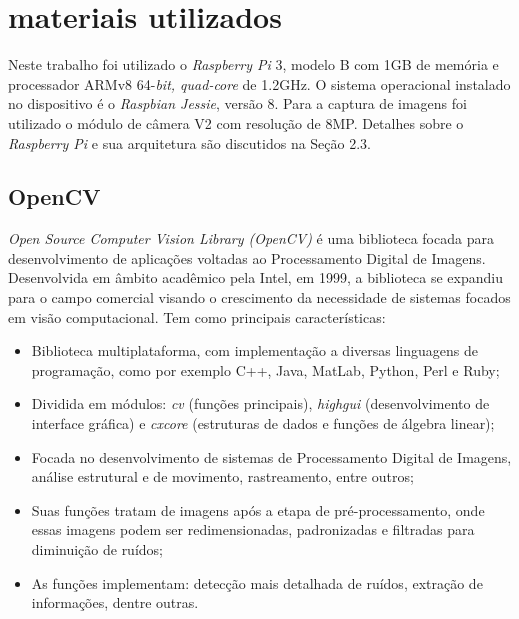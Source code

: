\documentclass[12pt,oneside,a4paper,chapter=TITLE,section=TITLE,sumario=tradicional]{abntex2}
\begin{document}
\section{materiais utilizados}

Neste trabalho foi utilizado o \textit{Raspberry Pi} 3, modelo B com 1GB de memória e processador ARMv8 64-\textit{bit, quad-core} de 1.2GHz. O sistema operacional instalado no dispositivo é o \textit{Raspbian Jessie}, versão 8. Para a captura de imagens foi utilizado o módulo de câmera V2 com resolução de 8MP. Detalhes sobre o \textit{Raspberry Pi} e sua arquitetura são discutidos na Seção 2.3.

\subsection{OpenCV}
\textit{Open Source Computer Vision Library (OpenCV)} é uma biblioteca focada para desenvolvimento de aplicações voltadas ao Processamento Digital de Imagens. Desenvolvida em âmbito acadêmico pela Intel, em 1999, a biblioteca se expandiu para o campo comercial visando o crescimento da necessidade de sistemas focados em visão computacional. Tem como principais características:
\begin{lista}
	\begin{itemize}
	    \item Biblioteca multiplataforma, com implementação a diversas linguagens de programação, como por exemplo C++, Java, MatLab, Python, Perl e Ruby;
	\end{itemize}
	\begin{itemize}
	    \item Dividida em módulos: \textit{cv} (funções principais), \textit{highgui} (desenvolvimento de interface gráfica) e \textit{cxcore} (estruturas de dados e funções de álgebra linear);
	\end{itemize}
	\begin{itemize}
	    \item Focada no desenvolvimento de sistemas de Processamento Digital de Imagens, análise estrutural e de movimento, rastreamento, entre outros;
	\end{itemize}
	\begin{itemize}
	    \item Suas funções tratam de imagens após a etapa de pré-processamento, onde essas imagens podem ser redimensionadas, padronizadas e filtradas para diminuição de ruídos;
	\end{itemize}
	\begin{itemize}
	    \item As funções implementam: detecção mais detalhada de ruídos, extração de informações, dentre outras.
	\end{itemize}
\end{lista}
\end{document}
